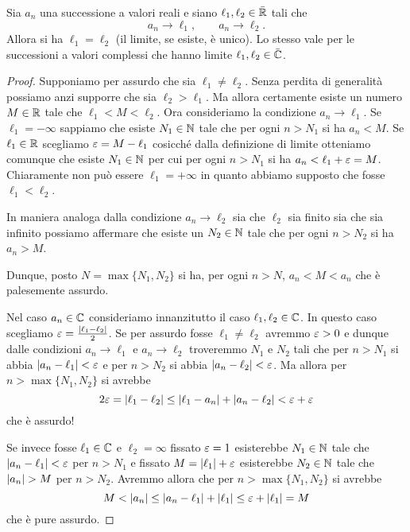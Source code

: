 \begin{theorem}
%
%
%
Sia $a_n$ una successione a valori reali e siano $\ell_1,\ell_2\in \bar {\mathbb R}$
tali che
\[
  a_n \to \ell_1, \qquad
  a_n \to \ell_2.
\]
Allora si ha $\ell_1=\ell_2$ (il limite, se esiste, è unico).
Lo stesso vale per le successioni a valori complessi che hanno limite
$\ell_1, \ell_2 \in \bar {\mathbb C}$.
\end{theorem}
%
\begin{proof}
Supponiamo per assurdo che sia $\ell_1\neq \ell_2$.
Senza perdita di generalità possiamo anzi supporre
che sia $\ell_2 > \ell_1$. Ma allora certamente
esiste un numero $M\in \mathbb R$ tale che $\ell_1 < M < \ell_2$.
Ora consideriamo la condizione $a_n\to \ell_1$.
Se $\ell_1=-\infty$ sappiamo che esiste $N_1\in\mathbb N$
tale che per ogni $n> N_1$ si ha $a_n < M$.
Se $\ell_1\in \mathbb R$ scegliamo $\varepsilon = M-\ell_1$
cosicché dalla definizione di limite otteniamo comunque
che esiste $N_1\in \mathbb N$ per cui per ogni $n>N_1$ si
ha $a_n < \ell_1+\varepsilon = M$. Chiaramente non può essere
$\ell_1=+\infty$ in quanto abbiamo supposto che fosse
$\ell_1 < \ell_2$.

In maniera analoga dalla condizione $a_n\to \ell_2$
sia che $\ell_2$ sia finito sia che sia infinito
possiamo affermare che esiste un $N_2\in \mathbb N$ tale
che per ogni $n>N_2$ si ha $a_n > M$.

Dunque, posto $N=\max\{N_1,N_2\}$ si ha,
per ogni $n>N$, $a_n < M < a_n$ che è palesemente assurdo.

Nel caso $a_n\in \mathbb C$ consideriamo innanzitutto
il caso $\ell_1,\ell_2 \in \mathbb C$. In questo
caso scegliamo $\varepsilon = \frac{{\left|\ell_1-\ell_2\right|}}{2}$.
Se per assurdo fosse $\ell_1\neq \ell_2$ avremmo $\varepsilon>0$
e dunque dalle condizioni $a_n\to \ell_1$
e $a_n \to \ell_2$ troveremmo $N_1$ e $N_2$
tali che per $n>N_1$ si abbia ${\left|a_n-\ell_1\right|}<\varepsilon$
e per $n>N_2$ si abbia ${\left|a_n -\ell_2\right|}<\varepsilon$. Ma allora
per $n>\max\{N_1,N_2\}$ si avrebbe
\[
  2\varepsilon
  = {\left|\ell_1-\ell_2\right|}
  \le {\left|\ell_1-a_n\right|} + {\left|a_n-\ell_2\right|}
  < \varepsilon + \varepsilon
\]
che è assurdo!

Se invece fosse $\ell_1\in \mathbb C$ e $\ell_2=\infty$
fissato $\varepsilon=1$ esisterebbe $N_1\in \mathbb N$
tale che ${\left|a_n-\ell_1\right|}<
\varepsilon$ per $n>N_1$ e fissato $M={\left|\ell_1\right|}+\varepsilon$
esisterebbe $N_2\in \mathbb N$ tale che ${\left|a_n\right|} > M$ per $n>N_2$.
Avremmo allora che per $n>\max\{N_1,N_2\}$ si avrebbe
\[
  M
  <{\left|a_n\right|}
  \le {\left|a_n-\ell_1\right|}+{\left|\ell_1\right|}
  \le \varepsilon + {\left|\ell_1\right|} = M
\]
che è pure assurdo.
\end{proof}

